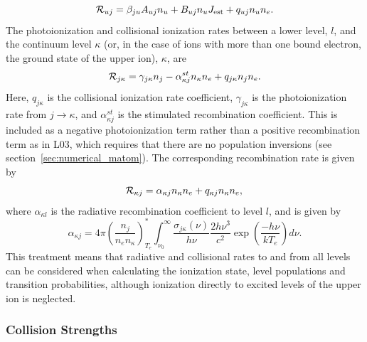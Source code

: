 \begin{equation}
{\cal R}_{uj} = \beta_{ju} A_{uj} n_u + B_{uj} n_u J_{\mathrm{est}}  +
q_{uj} n_u n_e.
\label{eq:ruj}
\end{equation}
The photoionization and collisional ionization rates
between a lower level, $l$, and the continuum level $\kappa$ 
(or, in the case of ions with more than one bound electron, 
the ground state of the upper ion),
$\kappa$, are
\begin{equation}
{\cal R}_{j \kappa}= \gamma_{j\kappa} n_j - \alpha^{st}_{\kappa j} n_\kappa n_e   + q_{j \kappa} n_j n_e.
\label{eq:rjk}
\end{equation}
Here, $q_{j \kappa}$ is the collisional ionization rate coefficient,
$\gamma_{j \kappa}$ is the photoionization rate
from $j \rightarrow \kappa$, and $\alpha^{st}_{\kappa j}$ is the stimulated recombination
coefficient. This is included as a negative photoionization term rather 
than a positive recombination term as in L03, which requires that there are
no population inversions (see section~\ref{sec:numerical_matom}). 
The corresponding recombination rate is given by
\begin{equation}
{\cal R}_{\kappa j} = \alpha_{\kappa j} n_{\kappa} n_e + q_{\kappa j}
n_\kappa n_e, \\
\end{equation}
where $\alpha_{\kappa l}$ is the radiative recombination coefficient
to level $l$, and is given by 
\begin{equation}
\alpha_{\kappa j} = 4\pi \left( \frac{n_j}{n_e n_\kappa} \right)^*_{T_e} \int^\infty_{\nu_0} 
\frac{\sigma_{j\kappa} (\nu)}{h \nu} \frac{2 h \nu^3}{c^2} 
\exp \left( \frac{- h \nu}{k T_e} \right) d\nu.
\label{eq:alpha_sp}
\end{equation}
This treatment means that radiative and collisional
rates to and from all levels can be considered when calculating the
ionization state, level populations and transition probabilities, 
although ionization directly to excited levels of the upper ion is 
neglected.

\subsubsection{Collision Strengths}
\label{sec:coll}

